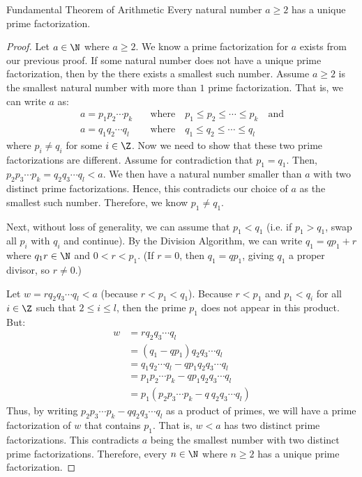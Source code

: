 \documentclass[letterpaper,12pt]{report}
\begin{document}
\begin{thmbox}{Fundamental Theorem of Arithmetic}{}
    Every natural number $a \geq 2$ has a unique prime factorization.
    \tcblower
    \begin{proof}
        Let $a \in \N$ where $a \geq 2$. We know a prime factorization for $a$ exists from our previous proof. If some natural number does not have a unique prime factorization, then by the  there exists a smallest such number. Assume $a \geq 2$ is the smallest natural number with more than $1$ prime factorization. That is, we can write $a$ as:
        \begin{align*}
            a = p_1 p_2 \cdots p_k \quad &\text{where} \quad p_1 \leq p_2 \leq \cdots \leq p_k \quad \text{and} \\
            a = q_1 q_2 \cdots q_l \quad &\text{where} \quad q_1 \leq q_2 \leq \cdots \leq q_l
        \end{align*}
        where $p_i \neq q_i$ for some $i \in \Z$. Now we need to show that these two prime factorizations are different. Assume for contradiction that $p_1 = q_1$. Then, $p_2 p_3 \cdots p_k = q_2 q_3 \cdots q_l < a$. We then have a natural number smaller than $a$ with two distinct prime factorizations. Hence, this contradicts our choice of $a$ as the smallest such number. Therefore, we know $p_1 \neq q_1$.

        Next, without loss of generality, we can assume that $p_1 < q_1$ (i.e. if $p_1 > q_1$, swap all $p_i$ with $q_i$ and continue). By the Division Algorithm, we can write $q_1 = qp_1 + r$ where $q_1r \in \N$ and $0<r<p_1$. (If $r=0$, then $q_1 = qp_1$, giving $q_1$ a proper divisor, so $r \neq 0$.)

        Let $w = rq_2 q_3 \cdots q_l < a$ (because $r < p_1 < q_1$). Because $r < p_1$ and $p_1 < q_i$ for all $i \in \Z$ such that $2 \leq i \leq l$, then the prime $p_1$ does not appear in this product. But:
        \begin{align*}
            w &= r q_2 q_3 \cdots q_l \\
            &= (q_1 - qp_1) q_2 q_3 \cdots q_l \\
            &= q_1 q_2 \cdots q_l - q p_1 q_2 q_3 \cdots q_l \\
            &= p_1 p_2 \cdots p_k - q p_1 q_2 q_3 \cdots q_l \\
            &= p_1 (p_2 p_3 \cdots p_k - q\ q_2 q_3 \cdots q_l)
        \end{align*}
        Thus, by writing $p_2 p_3 \cdots p_k - q q_2 q_3 \cdots q_l$ as a product of primes, we will have a prime factorization of $w$ that contains $p_1$. That is, $w<a$ has two distinct prime factorizations. This contradicts $a$ being the smallest number with two distinct prime factorizations. Therefore, every $n \in \N$ where $n \geq 2$ has a unique prime factorization.
    \end{proof}
\end{thmbox}
\end{document}
